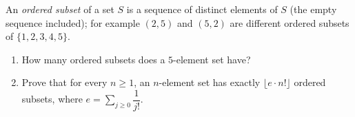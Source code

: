 An \emph{ordered subset} of a set $S$ is a sequence of distinct elements of $S$ (the empty sequence included); for example $(2,5)$ and $(5,2)$ are different ordered subsets of $\{1,2,3,4,5\}$.
\begin{enumerate}
\item[(a)] How many ordered subsets does a $5$-element set have?
\item[(b)] Prove that for every $n\ge1$, an $n$-element set has exactly $\lfloor e\cdot n!\rfloor$ ordered subsets, where $e=\displaystyle\sum_{j\ge0}\dfrac{1}{j!}$.
\end{enumerate}
